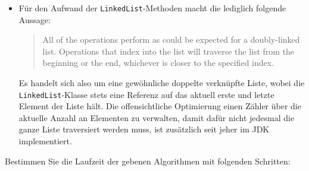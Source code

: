 \documentclass[german, solution]{acAssignment}
\begin{document}
\begin{itemize}[itemsep=0.4cm]
    \item
        \begin{myAlgTable}{5}
            \myAlgTableRow{}{}
            \myAlgTableRow{}{}
            \myAlgTableRow{}{\}}
        \end{myAlgTable}
        
        Für den Aufwand der \texttt{LinkedList}-Methoden macht die  lediglich folgende Aussage:
        \begin{quote}
            All of the operations perform as could be expected for a doubly-linked list.
            Operations that index into the list will traverse the list from the beginning or the end, whichever is closer to the specified index.
        \end{quote}
        Es handelt sich also um eine gewöhnliche doppelte verknüpfte Liste, wobei die \texttt{LinkedList}-Klasse stets eine Referenz auf das aktuell erste und letzte Element der Liste hält.
        Die offensichtliche Optimierung einen Zähler über die aktuelle Anzahl an Elementen zu verwalten, damit dafür nicht jedesmal die ganze Liste traversiert werden muss, ist zusätzlich seit jeher im JDK implementiert.
\end{itemize}
\let\arraystretch\oldarraystretch

\clearpage
Bestimmen Sie die Laufzeit der gebenen Algorithmen mit folgenden Schritten:
\end{document}
